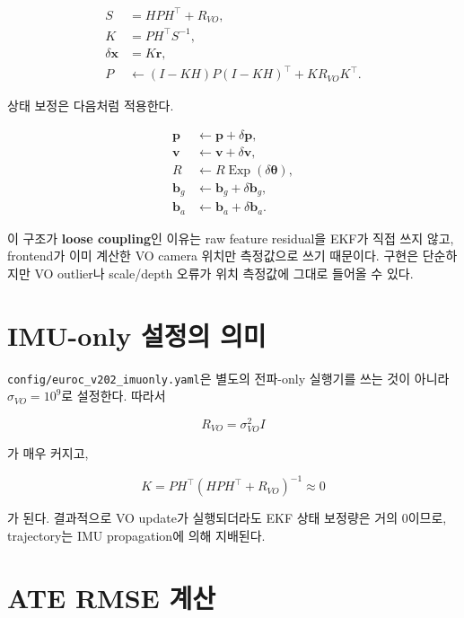 \documentclass[11pt,a4paper,oneside]{report}
\begin{document}
\begin{align}
S &= HPH^{\top}+R_{VO}, \\
K &= PH^{\top}S^{-1}, \\
\delta\mathbf{x} &= K\mathbf{r}, \\
P &\leftarrow (I-KH)P(I-KH)^{\top}+KR_{VO}K^{\top}.
\end{align}

상태 보정은 다음처럼 적용한다.

\begin{align}
\mathbf{p} &\leftarrow \mathbf{p}+\delta\mathbf{p}, \\
\mathbf{v} &\leftarrow \mathbf{v}+\delta\mathbf{v}, \\
R &\leftarrow R\operatorname{Exp}(\delta\boldsymbol{\theta}), \\
\mathbf{b}_g &\leftarrow \mathbf{b}_g+\delta\mathbf{b}_g, \\
\mathbf{b}_a &\leftarrow \mathbf{b}_a+\delta\mathbf{b}_a.
\end{align}

\begin{infobox}
이 구조가 \textbf{loose coupling}인 이유는 raw feature residual을 EKF가 직접 쓰지 않고,
frontend가 이미 계산한 VO camera 위치만 측정값으로 쓰기 때문이다. 구현은 단순하지만
VO outlier나 scale/depth 오류가 위치 측정값에 그대로 들어올 수 있다.
\end{infobox}

\section{IMU-only 설정의 의미}

\texttt{config/euroc\_v202\_imuonly.yaml}은 별도의 전파-only 실행기를 쓰는 것이 아니라
\(\sigma_{VO}=10^9\)로 설정한다. 따라서

\begin{equation}
R_{VO}=\sigma_{VO}^{2}I
\end{equation}

가 매우 커지고,

\begin{equation}
K = PH^{\top}(HPH^{\top}+R_{VO})^{-1} \approx 0
\end{equation}

가 된다. 결과적으로 VO update가 실행되더라도 EKF 상태 보정량은 거의 0이므로,
trajectory는 IMU propagation에 의해 지배된다.

\section{ATE RMSE 계산}
\end{document}
